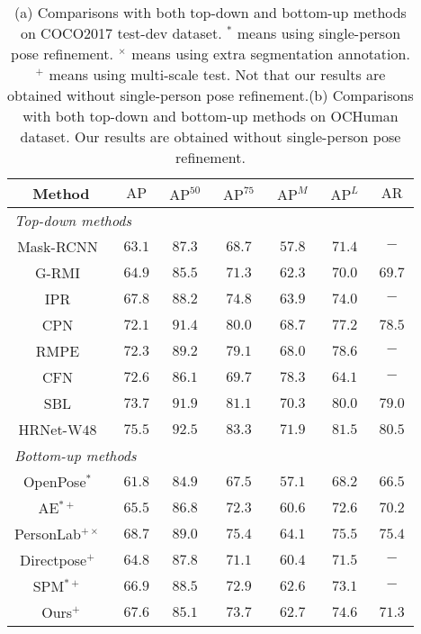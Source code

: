 \documentclass[runningheads]{llncs}
\begin{document}
	
	\begin{table}[t]
		\centering
		\caption{(a) Comparisons with both top-down and bottom-up methods on COCO2017 test-dev dataset. $^{*}$ means using single-person pose refinement. $^{\times}$ means using extra segmentation annotation. $^{+}$ means using multi-scale test. Not that our results are obtained without single-person pose refinement.(b) Comparisons with both top-down and bottom-up methods on OCHuman dataset. Our results are obtained without single-person pose refinement.} 
		\begin{subtable}[b]{0.45\textwidth}
			\centering
			\tiny
			\begin{tabular}{c|c|c|c|c|c|c}
				\hline  
				Method &  $\operatorname{AP}$ & $\operatorname{AP}^{50}$ & $\operatorname{AP}^{75}$ & $\operatorname{AP}^{M}$ & $\operatorname{AP}^{L}$ & $\operatorname{AR}$\\
				\hline
				\multicolumn{7}{l}{\emph{Top-down methods}}\\
				\hline
				Mask-RCNN~\cite{he2017mask}& $63.1$ & $87.3$&$68.7$&$57.8$&$71.4$&$-$\\
				G-RMI~\cite{papandreou2017towards} &$64.9$ & $85.5$&$71.3$&$62.3$&$70.0$&$69.7$\\
				IPR~\cite{sun2018integral}  &$67.8$ & $88.2$&$74.8$&$63.9$&$74.0$&$-$\\
				CPN~\cite{chen2018cascaded}  & $72.1$ & $91.4$&$80.0$&$68.7$&$77.2$&$78.5$\\
				RMPE~\cite{fang2017rmpe}  &$72.3$ & $89.2$&$79.1$&$68.0$&$78.6$&$-$\\
				CFN~\cite{huang2017coarse}  & $72.6$ & $86.1$&$69.7$&$78.3$&$64.1$&$-$\\
				SBL~\cite{xiao2018simple} &${73.7}$ & ${91.9}$&${81.1}$&${70.3}$&${80.0}$&${79.0}$\\
				HRNet-W$48$~\cite{sun2019deep} & ${75.5}$&${92.5}$&${83.3}$&${71.9}$&${81.5}$&${80.5}$\\ \hline
				\multicolumn{7}{l}{\emph{Bottom-up methods}}\\
				\hline
				OpenPose$^{*}$~\cite{cao2017realtime} &$61.8$ & $84.9$&$67.5$&$57.1$&$68.2$&$66.5$\\
				AE$^{*+}$~\cite{newell2017associative}  &$65.5$ & $86.8$&$72.3$&$60.6$&$72.6$&$70.2$\\
				PersonLab$^{+\times}$~\cite{papandreou2018personlab}  &$68.7$ & $89.0$&$75.4$&$64.1$&$75.5$&$75.4$\\
				Directpose$^{+}$~\cite{tian2019directpose} & $64.8$ & $87.8$ &$71.1$ & $60.4$&$71.5$&$-$\\
				SPM$^{*+}$~\cite{nie2019single}  &$66.9$ & $88.5$&$72.9$&$62.6$&$73.1$&$-$\\
				Ours$^{+}$ &$67.6$&$85.1$&$73.7$&$62.7$&$74.6$&$71.3$\\ \hline \hline
			\end{tabular}
			

\end{subtable}
\end{table}
\end{document}

